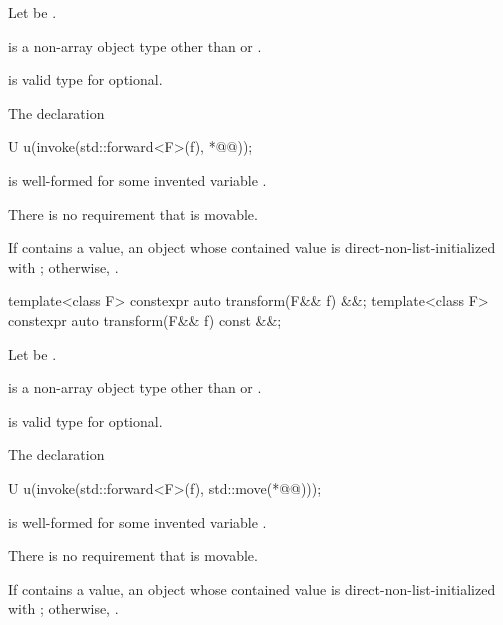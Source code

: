 \begin{itemdescr}
\pnum
Let  be .

\pnum
\mandates
\begin{removedblock}
 is a non-array object type
other than  or .
\end{removedblock}
\begin{addedblock}
 is valid type for optional.
\end{addedblock}
The declaration
\begin{codeblock}
U u(invoke(std::forward<F>(f), *@@));
\end{codeblock}
is well-formed for some invented variable .
\begin{note}
There is no requirement that  is movable.
\end{note}

\pnum
\returns
If  contains a value, an  object
whose contained value is direct-non-list-initialized with
;
otherwise, .
\end{itemdescr}

\begin{itemdecl}
template<class F> constexpr auto transform(F&& f) &&;
template<class F> constexpr auto transform(F&& f) const &&;
\end{itemdecl}

\begin{itemdescr}
\pnum
Let  be
.

\pnum
\mandates
\begin{removedblock}
 is a non-array object type
other than  or .
\end{removedblock}
\begin{addedblock}
 is valid type for optional.
\end{addedblock}
The declaration
\begin{codeblock}
U u(invoke(std::forward<F>(f), std::move(*@@)));
\end{codeblock}
is well-formed for some invented variable .
\begin{note}
There is no requirement that  is movable.
\end{note}

\pnum
\returns
If  contains a value, an  object
whose contained value is direct-non-list-initialized with
;
otherwise, .
\end{itemdescr}

